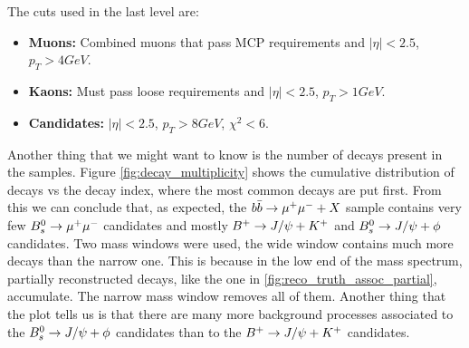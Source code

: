 The cuts used in the last level are:

\begin{itemize}
    \item \textbf{Muons:} Combined muons that pass MCP requirements and $|\eta|<2.5$, $p_{T}>4GeV$.
    \item \textbf{Kaons:} Must pass loose requirements and $|\eta|<2.5$, $p_{T}>1GeV$.
    \item \textbf{Candidates:} $|\eta|<2.5$, $p_{T}>8GeV$, $\chi^{2}<6$.
\end{itemize}

Another thing that we might want to know is the number of decays present in the samples. Figure 
\ref{fig:decay_multiplicity} shows the cumulative distribution of decays vs the decay index, where the most
common decays are put first. From this we can conclude that, as expected, the $b\bar{b}\rightarrow\mu^+\mu^-+X$ sample
contains very few $B_{s}^{0}\rightarrow \mu^{+}\mu^{-}$ candidates and mostly $B^{+}\rightarrow J/\psi+K^{+}$ and $B_{s}^{0}\rightarrow J/\psi + \phi$ candidates.
Two mass windows were used, the wide window contains much more decays than the narrow one.
This is because in the low end of the mass spectrum, partially reconstructed decays, like the one
in \ref{fig:reco_truth_assoc_partial}, accumulate. The narrow mass window removes all of them.
Another thing that the plot tells us is that there are many more background processes associated
to the $B_{s}^{0}\rightarrow J/\psi + \phi$ candidates than to the $B^{+}\rightarrow J/\psi+K^{+}$ candidates.

